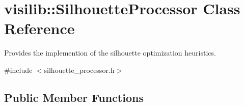 \hypertarget{classvisilib_1_1_silhouette_processor}{}\section{visilib\+::Silhouette\+Processor Class Reference}
\label{classvisilib_1_1_silhouette_processor}


Provides the implemention of the silhouette optimization heuristics.  




{\ttfamily \#include $<$silhouette\+\_\+processor.\+h$>$}

\subsection*{Public Member Functions}
